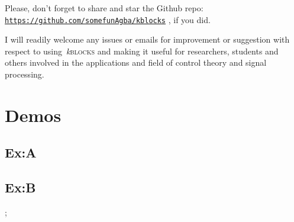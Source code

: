 \documentclass[onecolumn,a4paper,10pt]{IEEEtran}
\newcommand*{\kblocks}{\relax~\textit{k}\textsc{blocks}}
\newcommand*{\spacetweak}{\medskip\medskip}
\newcommand*{\urlink}[1]{{
		{\texttt{\url{#1}}}
}}
\begin{document}
Please, don't forget to share and star the Github repo: \urlink{https://github.com/somefunAgba/kblocks}, if you did.

I will readily welcome any issues or emails for improvement or suggestion with respect to
using\kblocks{} and making it useful for researchers, students and others involved in the applications and field of control theory and signal processing.


\pagebreak
\section{Demos}
\centering
\spacetweak
\subsection{Ex:A}\spacetweak
\begin{SideBySideExample}[label=\fbox{A},xrightmargin=10cm]
\begin{kblock}
\end{kblock}
\end{SideBySideExample}

\subsection{Ex:B}
\spacetweak\spacetweak
\begin{SideBySideExample}[label=\fbox{B},xrightmargin=10cm]
\begin{kblock}
;
\end{kblock}
\end{SideBySideExample}
\end{document}
